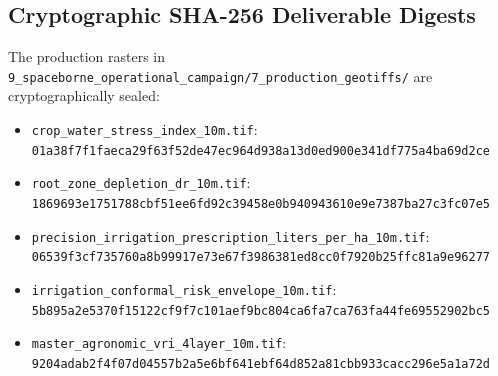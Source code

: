 \documentclass[11pt,a4paper]{article}
\theoremstyle{definition}
\theoremstyle{remark}
\begin{document}
\subsection{Cryptographic SHA-256 Deliverable Digests}
The production rasters in \texttt{9\_spaceborne\_operational\_campaign/7\_production\_geotiffs/} are cryptographically sealed:
\begin{itemize}
    \item \texttt{crop\_water\_stress\_index\_10m.tif}:\\
    \texttt{\footnotesize 01a38f7f1faeca29f63f52de47ec964d938a13d0ed900e341df775a4ba69d2ce}
    \item \texttt{root\_zone\_depletion\_dr\_10m.tif}:\\
    \texttt{\footnotesize 1869693e1751788cbf51ee6fd92c39458e0b940943610e9e7387ba27c3fc07e5}
    \item \texttt{precision\_irrigation\_prescription\_liters\_per\_ha\_10m.tif}:\\
    \texttt{\footnotesize 06539f3cf735760a8b99917e73e67f3986381ed8cc0f7920b25ffc81a9e96277}
    \item \texttt{irrigation\_conformal\_risk_envelope\_10m.tif}:\\
    \texttt{\footnotesize 5b895a2e5370f15122cf9f7c101aef9bc804ca6fa7ca763fa44fe69552902bc5}
    \item \texttt{master\_agronomic\_vri\_4layer\_10m.tif}:\\
    \texttt{\footnotesize 9204adab2f4f07d04557b2a5e6bf641ebf64d852a81cbb933cacc296e5a1a72d}
\end{itemize}
\end{document}
